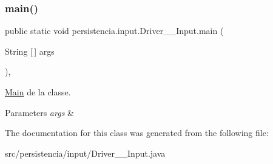 \subsubsection{\texorpdfstring{main()}{main()}}
{\footnotesize\ttfamily public static void persistencia.\+input.\+Driver\+\_\+\+\_\+\+Input.\+main (\begin{DoxyParamCaption}\item[{String \mbox{[}$\,$\mbox{]}}]{args }\end{DoxyParamCaption})\hspace{0.3cm}{\ttfamily [inline]}, {\ttfamily [static]}}



\hyperlink{classMain}{Main} de la classe. 


\begin{DoxyParams}{Parameters}
{\em args} & \\
\hline
\end{DoxyParams}


The documentation for this class was generated from the following file\+:\begin{DoxyCompactItemize}
\item 
src/persistencia/input/Driver\+\_\+\+\_\+\+Input.\+java\end{DoxyCompactItemize}
